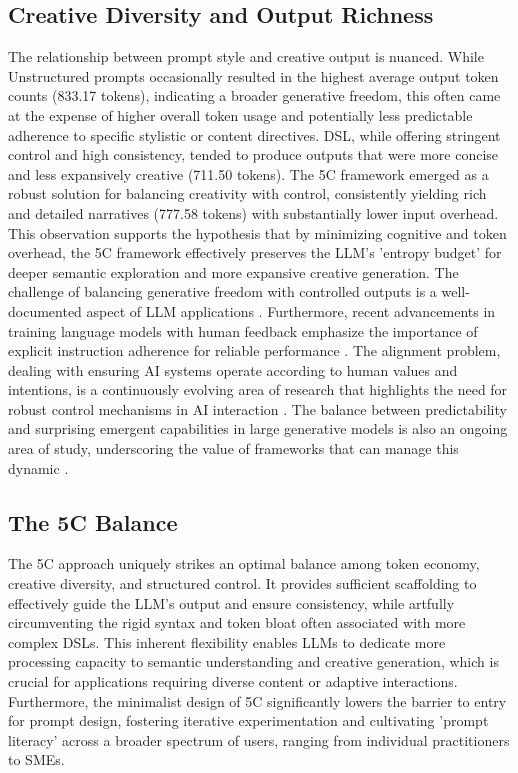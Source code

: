 \documentclass[10pt, a4paper]{article}
\begin{document}
\subsection{Creative Diversity and Output Richness}
The relationship between prompt style and creative output is nuanced. While Unstructured prompts occasionally resulted in the highest average output token counts (833.17 tokens), indicating a broader generative freedom, this often came at the expense of higher overall token usage and potentially less predictable adherence to specific stylistic or content directives. DSL, while offering stringent control and high consistency, tended to produce outputs that were more concise and less expansively creative (711.50 tokens). The 5C framework emerged as a robust solution for balancing creativity with control, consistently yielding rich and detailed narratives (777.58 tokens) with substantially lower input overhead. This observation supports the hypothesis that by minimizing cognitive and token overhead, the 5C framework effectively preserves the LLM's 'entropy budget' for deeper semantic exploration and more expansive creative generation. The challenge of balancing generative freedom with controlled outputs is a well-documented aspect of LLM applications \cite{vaswani2017attention}. Furthermore, recent advancements in training language models with human feedback emphasize the importance of explicit instruction adherence for reliable performance \cite{ouyang2022training}. The alignment problem, dealing with ensuring AI systems operate according to human values and intentions, is a continuously evolving area of research that highlights the need for robust control mechanisms in AI interaction \cite{leike2018scalable}. The balance between predictability and surprising emergent capabilities in large generative models is also an ongoing area of study, underscoring the value of frameworks that can manage this dynamic \cite{ganguli2022predictability}.

\subsection{The 5C Balance}
The 5C approach uniquely strikes an optimal balance among token economy, creative diversity, and structured control. It provides sufficient scaffolding to effectively guide the LLM's output and ensure consistency, while artfully circumventing the rigid syntax and token bloat often associated with more complex DSLs. This inherent flexibility enables LLMs to dedicate more processing capacity to semantic understanding and creative generation, which is crucial for applications requiring diverse content or adaptive interactions. Furthermore, the minimalist design of 5C significantly lowers the barrier to entry for prompt design, fostering iterative experimentation and cultivating 'prompt literacy' across a broader spectrum of users, ranging from individual practitioners to SMEs.
\end{document}
